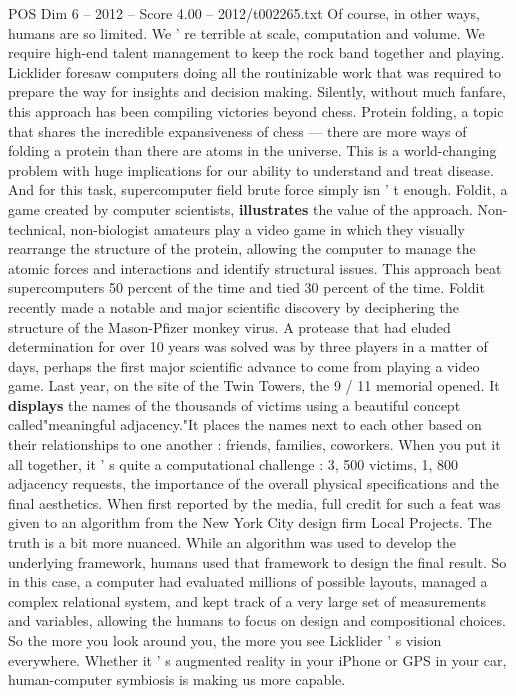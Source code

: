 \begin{textsample}{POS Dim 6 – 2012 – Score 4.00 – 2012/t002265.txt}
Of course, in other ways, humans are so limited.
We ' re terrible at scale, computation and volume.
We require high-end talent management to keep the rock band together and playing.
Licklider foresaw computers doing all the routinizable work that was required to prepare the way for insights and decision making.
Silently, without much fanfare, this approach has been compiling victories beyond chess.
Protein folding, a topic that shares the incredible expansiveness of chess — there are more ways of folding a protein than there are atoms in the universe.
This is a world-changing problem with huge implications for our ability to understand and treat disease.
And for this task, supercomputer field brute force simply isn ' t enough.
Foldit, a game created by computer scientists, \textbf{illustrates} the value of the approach.
Non-technical, non-biologist amateurs play a video game in which they visually rearrange the structure of the protein, allowing the computer to manage the atomic forces and interactions and identify structural issues.
This approach beat supercomputers 50 percent of the time and tied 30 percent of the time.
Foldit recently made a notable and major scientific discovery by deciphering the structure of the Mason-Pfizer monkey virus.
A protease that had eluded determination for over 10 years was solved was by three players in a matter of days, perhaps the first major scientific advance to come from playing a video game.
Last year, on the site of the Twin Towers, the 9 / 11 memorial opened.
It \textbf{displays} the names of the thousands of victims using a beautiful concept called"meaningful adjacency."It places the names next to each other based on their relationships to one another : friends, families, coworkers.
When you put it all together, it ' s quite a computational challenge : 3, 500 victims, 1, 800 adjacency requests, the importance of the overall physical specifications and the final aesthetics.
When first reported by the media, full credit for such a feat was given to an algorithm from the New York City design firm Local Projects.
The truth is a bit more nuanced.
While an algorithm was used to develop the underlying framework, humans used that framework to design the final result.
So in this case, a computer had evaluated millions of possible layouts, managed a complex relational system, and kept track of a very large set of measurements and variables, allowing the humans to focus on design and compositional choices.
So the more you look around you, the more you see Licklider ' s vision everywhere.
Whether it ' s augmented reality in your iPhone or GPS in your car, human-computer symbiosis is making us more capable.

\end{textsample}
